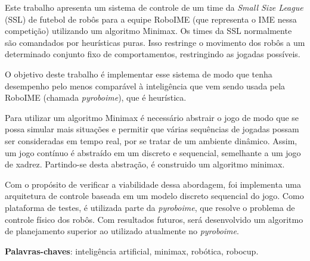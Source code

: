 \setlength{\absparsep}{18pt} %
\begin{resumo}

  Este trabalho apresenta um sistema de controle de um time da \textit{Small
  Size League} (SSL) de futebol de robôs para a equipe RoboIME (que representa o
  IME nessa competição) utilizando um algoritmo Minimax. Os times da SSL
  normalmente são comandados por heurísticas puras. Isso restringe o movimento
  dos robôs a um determinado conjunto fixo de comportamentos, restringindo as
  jogadas possíveis.

  O objetivo deste trabalho é implementar esse sistema de modo que tenha
  desempenho pelo menos comparável à inteligência que vem sendo usada pela
  RoboIME (chamada \textit{pyroboime}), que é heurística.

  Para utilizar um algoritmo Minimax é necessário abstrair o jogo de modo que se
  possa simular mais situações e permitir que várias sequências de jogadas
  possam ser consideradas em tempo real, por se tratar de um ambiente dinâmico.
  Assim, um jogo contínuo é abstraído em um discreto e sequencial,
  semelhante a um jogo de xadrez. Partindo-se desta abstração, é construido
  um algoritmo minimax.

  Com o propósito de verificar a viabilidade dessa abordagem, foi implementa uma
  arquitetura de controle baseada em um modelo discreto sequencial do jogo.
  Como plataforma de testes, é utilizada parte da \textit{pyroboime}, que
  resolve o problema de controle físico dos robôs. Com resultados futuros, será
  desenvolvido um algoritmo de planejamento superior ao utilizado atualmente no
  \textit{pyroboime}.


  \textbf{Palavras-chaves}: inteligência artificial, minimax, robótica, robocup.
\end{resumo}

